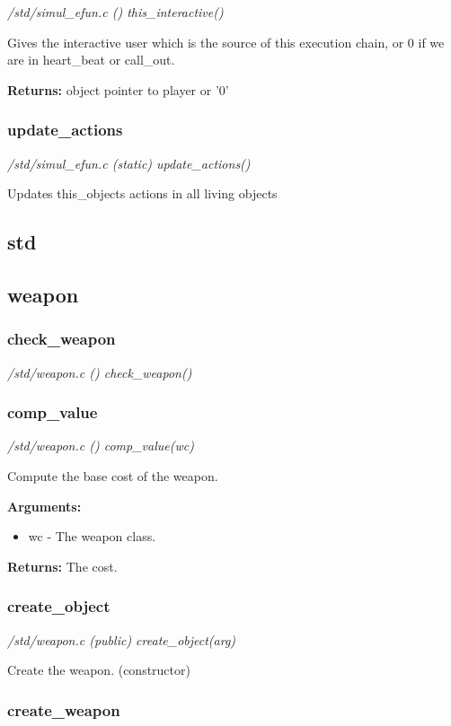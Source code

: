 {\em /std/simul\_efun.c () this\_interactive()}

Gives the interactive user which is the source of this
execution chain, or 0 if we are in heart\_beat or call\_out.

{\bf Returns:}    object pointer to player or '0'


\subsubsection{update\_actions}

{\em /std/simul\_efun.c (static) update\_actions()}

Updates this\_objects actions in all living objects


\subsection{std}
\subsection{weapon}
\subsubsection{check\_weapon}

{\em /std/weapon.c () check\_weapon()}



\subsubsection{comp\_value}

{\em /std/weapon.c () comp\_value(wc)}

Compute the base cost of the weapon.

{\bf Arguments:}
\begin{itemize}
\item     wc - The weapon class.
\end{itemize}

{\bf Returns:}        The cost.


\subsubsection{create\_object}

{\em /std/weapon.c (public) create\_object(arg)}

Create the weapon. (constructor)


\subsubsection{create\_weapon}

